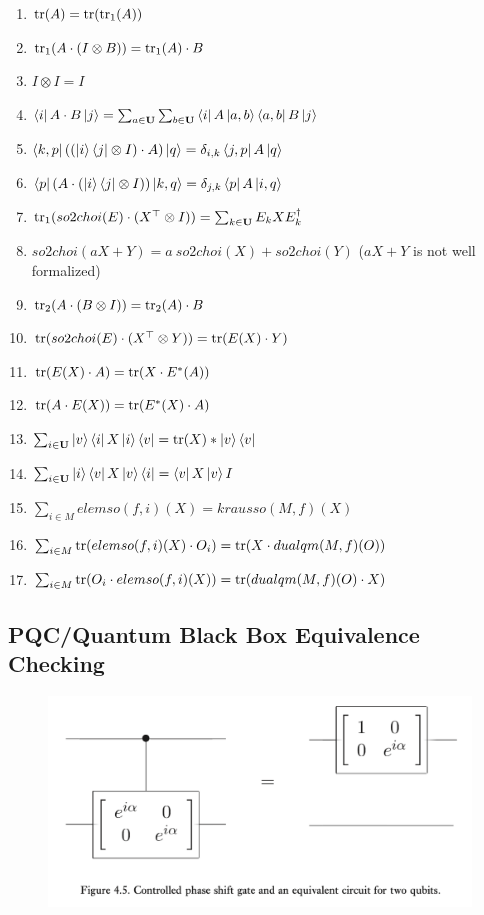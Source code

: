 \documentclass[manuscript, review, timestamp]{acmart}
\begin{document}
\begin{enumerate}
  \item \pass $\mathrm{tr}(A) = \mathrm{tr}(\mathrm{tr}_1(A))$
  \item \pass $\mathrm{tr}_1 (A \cdot (I \otimes B)) = \mathrm{tr}_1 (A) \cdot B$
  \item \pass $I \otimes I = I$
  \item \pass $\bra{i} A \cdot B \ket{j} = \sum_{a\in\mathbf{U}} \sum_{b\in\mathbf{U}} \bra{i}A\ket{a,b}\bra{a,b}B\ket{j}$
  \item \pass $\bra{k,p} ((\ket{i}\bra{j} \otimes I) \cdot A) \ket{q} = \delta_{i, k} \bra{j, p} A \ket{q}$
  \item \pass $\bra{p} (A \cdot (\ket{i}\bra{j} \otimes I)) \ket{k, q} = \delta_{j, k} \bra{p} A \ket{i, q}$
  \item \pass $\mathrm{tr}_1(so2choi(E) \cdot (X^\top \otimes I)) = \sum_{k\in\mathbf{U}} E_k X E_k^\dagger$
  \item \fail $so2choi(a X + Y) =a\ so2choi(X) + so2choi(Y)$ ($aX + Y$ is not well formalized)
  \item \pass $\mathrm{tr}_2(A \cdot (B \otimes I)) = \mathrm{tr}_2(A) \cdot B$
  \item \pass $\mathrm{tr} (so2choi(E)\cdot (X^\top \otimes Y)) = \mathrm{tr}(E(X) \cdot Y)$
  \item \pass $\mathrm{tr} (E(X) \cdot A) = \mathrm{tr} (X \cdot E^*(A))$
  \item \pass $\mathrm{tr} (A \cdot E(X)) = \mathrm{tr} (E^*(X) \cdot A)$
  \item \pass $\sum_{i \in \mathbf{U}} \ket{v}\bra{i} X \ket{i}\bra{v} = \mathrm{tr}(X) * \ket{v}\bra{v}$
  \item \pass $\sum_{i \in \mathbf{U}} \ket{i}\bra{v}X\ket{v}\bra{i} = \bra{v}X\ket{v} I$
  \item \pass $\sum_{i \in M} elemso(f, i)(X) = krausso(M, f)(X)$
  \item \pass $\sum_{i \in M} \mathrm{tr}(elemso(f,i)(X)\cdot O_i) = \mathrm{tr} (X \cdot dualqm(M, f)(O))$
  \item \pass $\sum_{i \in M} \mathrm{tr}(O_i \cdot elemso(f,i)(X)) = \mathrm{tr} (dualqm(M,f)(O)\cdot X)$
\end{enumerate}

\subsection{PQC/Quantum Black Box Equivalence Checking}
\begin{figure}[h]
  \includegraphics*[width=\textwidth]{QCQI.Fig4.5.png}
\end{figure}
\end{document}
